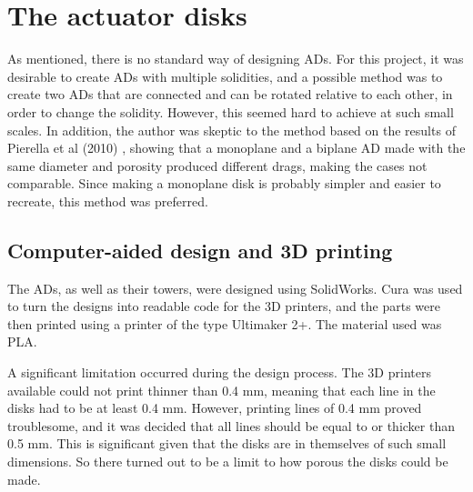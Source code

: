 \section{The actuator disks}
As mentioned, there is no standard way of designing \gls{AD}s. For this project, it was desirable to create \gls{AD}s with multiple solidities, and a possible method was to create two \gls{AD}s that are connected and can be rotated relative to each other, in order to change the solidity. However, this seemed hard to achieve at such small scales. In addition, the author was skeptic to the method based on the results of Pierella et al (2010) \cite{Pierella2010}, showing that a monoplane and a biplane \gls{AD} made with the same diameter and porosity produced different drags, making the cases not comparable. Since making a monoplane disk is probably simpler and easier to recreate, this method was preferred. 
 

\subsection{Computer-aided design and 3D printing}
The \gls{AD}s, as well as their towers, were designed using SolidWorks. Cura was used to turn the designs into readable code for the 3D printers, and the parts were then printed using a printer of the type Ultimaker 2+. The material used was PLA.

A significant limitation occurred during the design process. The 3D printers available could not print thinner than 0.4 \si{\mm}, meaning that each line in the disks had to be at least 0.4 \si{\mm}. However, printing lines of 0.4 \si{\mm} proved troublesome, and it was decided that all lines should be equal to or thicker than 0.5 \si{\mm}. This is significant given that the disks are in themselves of such small dimensions. So there turned out to be a limit to how porous the disks could be made. 


